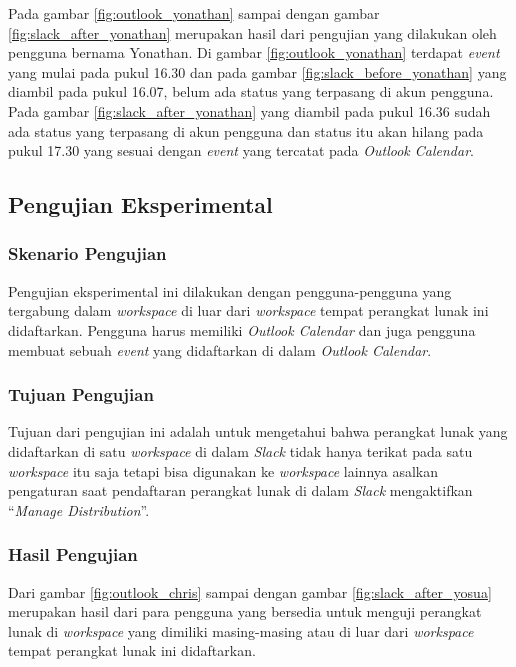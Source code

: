Pada gambar \ref{fig:outlook_yonathan} sampai dengan gambar \ref{fig:slack_after_yonathan} merupakan hasil dari pengujian yang dilakukan oleh pengguna bernama Yonathan. Di gambar \ref{fig:outlook_yonathan} terdapat \textit{event} yang mulai pada pukul 16.30 dan pada gambar \ref{fig:slack_before_yonathan} yang diambil pada pukul 16.07, belum ada status yang terpasang di akun pengguna. Pada gambar \ref{fig:slack_after_yonathan} yang diambil pada pukul 16.36 sudah ada status yang terpasang di akun pengguna dan status itu akan hilang pada pukul 17.30 yang sesuai dengan \textit{event} yang tercatat pada \textit{Outlook Calendar}. 

\subsection{Pengujian Eksperimental}
\subsubsection{Skenario Pengujian}
Pengujian eksperimental ini dilakukan dengan pengguna-pengguna yang tergabung dalam \textit{workspace} di luar dari \textit{workspace} tempat perangkat lunak ini didaftarkan. Pengguna harus memiliki \textit{Outlook Calendar} dan juga pengguna membuat sebuah \textit{event} yang didaftarkan di dalam \textit{Outlook Calendar}.
\subsubsection{Tujuan Pengujian}
Tujuan dari pengujian ini adalah untuk mengetahui bahwa perangkat lunak yang didaftarkan di satu \textit{workspace} di dalam \textit{Slack} tidak hanya terikat pada satu \textit{workspace} itu saja tetapi bisa digunakan ke \textit{workspace} lainnya asalkan pengaturan saat pendaftaran perangkat lunak di dalam \textit{Slack} mengaktifkan ``\textit{Manage Distribution}''. 
\subsubsection{Hasil Pengujian}
Dari gambar \ref{fig:outlook_chris} sampai dengan gambar \ref{fig:slack_after_yosua} merupakan hasil dari para pengguna yang bersedia untuk menguji perangkat lunak di \textit{workspace} yang dimiliki masing-masing atau di luar dari \textit{workspace} tempat perangkat lunak ini didaftarkan. 

